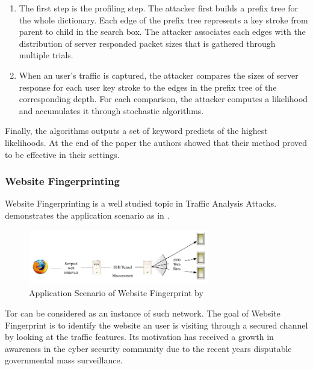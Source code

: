 \begin{enumerate}
	\item The first step is the profiling step. The attacker first builds a prefix tree\cite{PrefixTree} for the whole dictionary. Each edge of the prefix tree represents a key stroke from parent to child in the search box. The attacker associates each edges with the distribution of server responded packet sizes that is gathered through multiple trials. 
	\item When an user's traffic is captured, the attacker compares the sizes of server response for each user key stroke to the edges in the prefix tree of the corresponding depth. For each comparison, the attacker computes a likelihood and accumulates it through stochastic algorithms. 
\end{enumerate}

Finally, the algorithms outputs a set of keyword predicts of the highest likelihoods. At the end of the paper the authors showed that their method proved to be effective in their settings.

\subsubsection{Website Fingerprinting}
Website Fingerprinting is a well studied topic in Traffic Analysis Attacks. \cite{WebsiteFingerprint} demonstrates the application scenario as in . 

\begin{figure}[h!]
	\centering
	\includegraphics[width=0.7\textwidth]{fig/WebsiteFingerprint.png}
	\caption{Application Scenario of Website Fingerprint by \cite{WebsiteFingerprint}}
	\label{Fig: Application Scenario of Website Fingerprint}
\end{figure}

Tor\cite{Tor} can be considered as an instance of such network. The goal of Website Fingerprint is to identify the website an user is visiting through a secured channel by looking at the traffic features. Its motivation has received a growth in awareness in the cyber security community due to the recent years disputable governmental mass surveillance.


